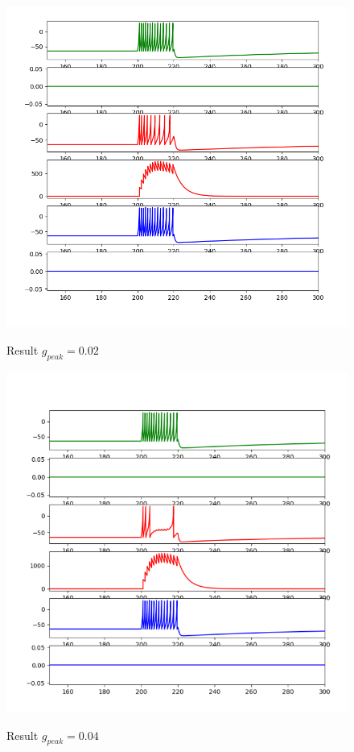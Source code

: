\documentclass[12pt]{article}
\begin{document}
\begin{figure}[H]
  \centering
  \includegraphics[width=.8\textwidth]{h3_p1_p3_200.png} %
  \label{img} %
  \caption{Result $g_{peak} = 0.02 $}
\end{figure}
\begin{figure}[H]
  \centering
  \includegraphics[width=.8\textwidth]{h3_p1_p3_400.png} %
  \label{img} %
  \caption{Result $g_{peak} = 0.04 $}
\end{figure}
\end{document}
